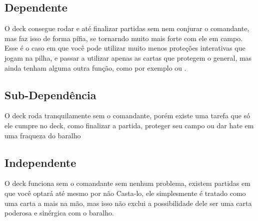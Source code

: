 \subsection{Dependente}
O deck consegue rodar e até finalizar partidas sem nem conjurar o comandante, mas faz isso de forma pífia, se tornarndo muito mais forte com ele em campo.
Esse é o caso em que você pode utilizar muito menos proteções interativas que jogam na pilha, e passar a utilizar apenas as cartas que protegem o general, mas ainda tenham alguma outra função, como por exemplo  ou .



\subsection{Sub-Dependência}
O deck roda tranquilamente sem o comandante, porém existe uma tarefa que só ele cumpre no deck, como finalizar a partida, proteger seu campo ou dar hate em uma fraqueza do baralho


\subsection{Independente}
O deck funciona sem o comandante sem nenhum problema, existem partidas em que você optará até mesmo por não Casta-lo, ele simplesmente é tratado como uma carta a mais na mão, mas isso não exclui a possibilidade dele ser uma carta poderosa e sinérgica com o baralho.